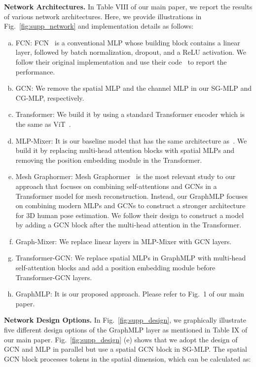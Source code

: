 \documentclass[lettersize,journal]{IEEEtran}
\begin{document}
\noindent \textbf{Network Architectures.}
In Table VIII of our main paper, we report the results of various network architectures. 
Here, we provide illustrations in Fig.~\ref{fig:supp_network} and implementation details as follows:
\begin{enumerate}[(a)]
  \item FCN: FCN~\cite{simplebaseline} is a conventional MLP whose building block contains a linear layer, followed by batch normalization, dropout, and a ReLU activation. 
  We follow their original implementation and use their code~\cite{code_baeline} to report the performance. 
  \item GCN: We remove the spatial MLP and the channel MLP in our SG-MLP and CG-MLP, respectively. 
  \item Transformer: We build it by using a standard Transformer encoder which is the same as ViT~\cite{vit}. 
  \item MLP-Mixer: It is our baseline model that has the same architecture as~\cite{mlpmixer}. We build it by replacing multi-head attention blocks with spatial MLPs and removing the position embedding module in the Transformer. 
  \item Mesh Graphormer: Mesh Graphormer~\cite{meshgraphormer} is the most relevant study to our approach that focuses on combining self-attentions and GCNs in a Transformer model for mesh reconstruction. 
  Instead, our GraphMLP focuses on combining modern MLPs and GCNs to construct a stronger architecture for 3D human pose estimation. 
  We follow their design to construct a model by adding a GCN block after the multi-head attention in the Transformer. 
  \item Graph-Mixer: We replace linear layers in MLP-Mixer with GCN layers. 
  \item Transformer-GCN: We replace spatial MLPs in GraphMLP with multi-head self-attention blocks and add a position embedding module before Transformer-GCN layers. 
  \item GraphMLP: It is our proposed approach. Please refer to Fig.~1 of our main paper. 
\end{enumerate}

\noindent \textbf{Network Design Options.}
In Fig.~\ref{fig:supp_design}, we graphically illustrate five different design options of the GraphMLP layer as mentioned in Table IX of our main paper. 
Fig.~\ref{fig:supp_design} (e) shows that we adopt the design of GCN and MLP in parallel but use a spatial GCN block in SG-MLP. 
The spatial GCN block processes tokens in the spatial dimension, which can be calculated as:
\end{document}
